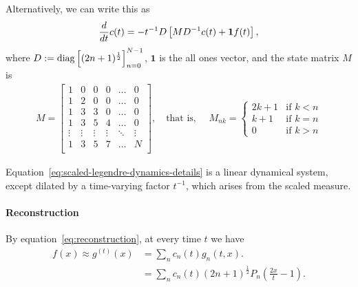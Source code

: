 \documentclass[../../hippo]{subfiles}
\begin{document}
Alternatively, we can write this as
\begin{equation}
  \frac{d}{d t} c(t) = -t^{-1} D
  \left[
    M D^{-1}
    c(t)
    +
    \mathbf{1}
    f(t)
  \right]
  ,
\end{equation}
where
$D := \operatorname*{diag} \left[ (2n+1)^{\frac{1}{2}} \right]_{n=0}^{N-1}$,
$\mathbf{1}$ is the all ones vector, and the state matrix $M$ is
\begin{align*}%
  M
  =
  \begin{bmatrix}
    1 & 0 & 0 & 0 & \dots & 0 \\
    1 & 2 & 0 & 0 & \dots & 0 \\
    1 & 3 & 3 & 0 & \dots & 0 \\
    1 & 3 & 5 & 4 & \dots & 0 \\
    \vdots & \vdots & \vdots & \vdots & \ddots & \vdots \\
    1 & 3 & 5 & 7 & \dots & N \\
  \end{bmatrix},
  \quad \text{that is, } \quad
  M_{nk} =
  \begin{cases}
    2k+1 & \mbox{if } k < n \\
    k+1 & \mbox{if } k = n \\
    0 & \mbox{if } k > n
  \end{cases}
\end{align*}


Equation~\eqref{eq:scaled-legendre-dynamics-details} is a linear dynamical system, except dilated by a time-varying factor $t^{-1}$, which arises from the scaled measure.

\paragraph{Reconstruction}


By equation~\eqref{eq:reconstruction}, at every time $t$ we have
\begin{align*}
  f(x) \approx g^{(t)}(x)
  &= \sum_n c_n(t) g_n(t, x).
  \\
  &= \sum_n c_n(t) (2n+1)^{\frac{1}{2}} P_n\left( \frac{2x}{t} - 1 \right).
\end{align*}
\end{document}
